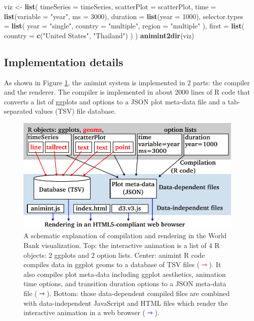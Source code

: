 \documentclass[12pt,]{isuthesis}
\newenvironment{Shaded}{\begin{snugshade}}{\end{snugshade}}
\newcommand{\KeywordTok}[1]{\textcolor[rgb]{0.13,0.29,0.53}{\textbf{{#1}}}}
\newcommand{\DataTypeTok}[1]{\textcolor[rgb]{0.13,0.29,0.53}{{#1}}}
\newcommand{\DecValTok}[1]{\textcolor[rgb]{0.00,0.00,0.81}{{#1}}}
\newcommand{\StringTok}[1]{\textcolor[rgb]{0.31,0.60,0.02}{{#1}}}
\newcommand{\NormalTok}[1]{{#1}}
\begin{document}
\begin{Shaded}
\begin{Highlighting}[]
\NormalTok{viz <-}\StringTok{ }\KeywordTok{list}\NormalTok{(}
  \DataTypeTok{timeSeries =} \NormalTok{timeSeries,}
  \DataTypeTok{scatterPlot =} \NormalTok{scatterPlot,}
  \DataTypeTok{time =} \KeywordTok{list}\NormalTok{(}\DataTypeTok{variable =} \StringTok{"year"}\NormalTok{, }\DataTypeTok{ms =} \DecValTok{3000}\NormalTok{),}
  \DataTypeTok{duration =} \KeywordTok{list}\NormalTok{(}\DataTypeTok{year =} \DecValTok{1000}\NormalTok{),}
  \DataTypeTok{selector.types =} \KeywordTok{list}\NormalTok{(}
    \DataTypeTok{year =} \StringTok{"single"}\NormalTok{,}
    \DataTypeTok{country =} \StringTok{"multiple"}\NormalTok{,}
    \DataTypeTok{region =} \StringTok{"multiple"}
  \NormalTok{),}
  \DataTypeTok{first =} \KeywordTok{list}\NormalTok{(}
    \DataTypeTok{country =} \KeywordTok{c}\NormalTok{(}\StringTok{"United States"}\NormalTok{, }\StringTok{"Thailand"}\NormalTok{)}
  \NormalTok{)}
\NormalTok{)}
\KeywordTok{animint2dir}\NormalTok{(viz)}
\end{Highlighting}
\end{Shaded}

\subsection{Implementation details}
\label{sec:implementation}

As shown in Figure \ref{fig:design}, the animint system is implemented
in 2 parts: the compiler and the renderer. The compiler is implemented
in about 2000 lines of R code that converts a list of ggplots and
options to a JSON plot meta-data file and a tab-separated values (TSV)
file database.

\begin{figure}[htbp]
\centering
\includegraphics{images/figure-design.pdf}
\caption{\label{fig:design}A schematic explanation of compilation and
rendering in the World Bank visualization. Top: the interactive
animation is a list of 4 R objects: 2 ggplots and 2 option lists.
Center: animint R code compiles data in ggplot geoms to a database of
TSV files (\textcolor{red}{$\rightarrowtriangle$}). It also compiles
plot meta-data including ggplot aesthetics, animation time options, and
transition duration options to a JSON meta-data file
(\(\rightarrowtriangle\)). Bottom: those data-dependent compiled files
are combined with data-independent JavaScript and HTML files which
render the interactive animation in a web browser
(\textcolor{blue}{$\rightarrowtriangle$}).}
\end{figure}
\end{document}
